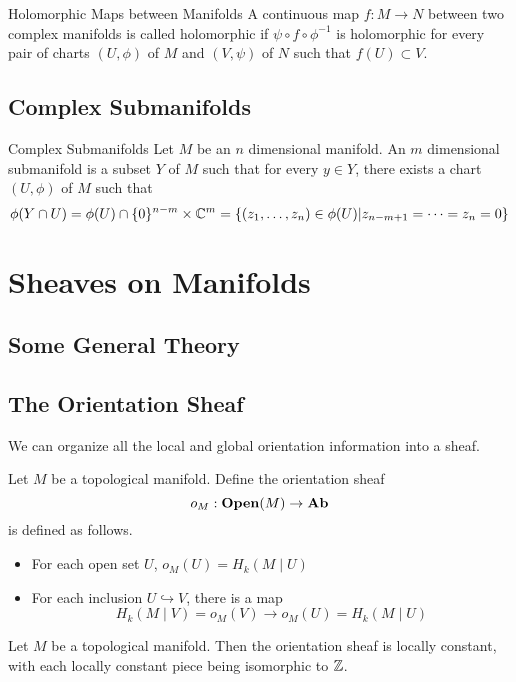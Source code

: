 \documentclass[a4paper]{article}
\begin{document}
\begin{defn}{Holomorphic Maps between Manifolds}{} A continuous map $f:M\to N$ between two complex manifolds is called holomorphic if $\psi\circ f\circ\phi^{-1}$ is holomorphic for every pair of charts $(U,\phi)$ of $M$ and $(V,\psi)$ of $N$ such that $f(U)\subset V$. 
\end{defn}

\subsection{Complex Submanifolds}
\begin{defn}{Complex Submanifolds}{} Let $M$ be an $n$ dimensional manifold. An $m$ dimensional submanifold is a subset $Y$ of $M$ such that for every $y\in Y$, there exists a chart $(U,\phi)$ of $M$ such that $$\phi(Y\cap U)=\phi(U)\cap\{0\}^{n-m}\times\mathbb{C}^m=\{(z_1,\dots,z_n)\in\phi(U)|z_{n-m+1}=\dots=z_n=0\}$$
\end{defn}

\pagebreak
\section{Sheaves on Manifolds}
\subsection{Some General Theory}


\subsection{The Orientation Sheaf}
We can organize all the local and global orientation information into a sheaf. 

\begin{defn} Let $M$ be a topological manifold. Define the orientation sheaf $$o_M:\bold{Open}(M)\to\bold{Ab}$$ is defined as follows. 
\begin{itemize}
\item For each open set $U$, $o_M(U)=H_k(M\;|\;U)$
\item For each inclusion $U\hookrightarrow V$, there is a map $$H_k(M\;|\;V)=o_M(V)\to o_M(U)=H_k(M\;|\;U)$$
\end{itemize}
\end{defn}

\begin{lmm}{}{} Let $M$ be a topological manifold. Then the orientation sheaf is locally constant, with each locally constant piece being isomorphic to $\mathbb{Z}$. 
\end{lmm}
\end{document}
